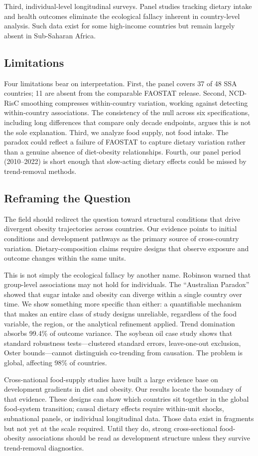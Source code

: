 Third, individual-level longitudinal surveys. Panel studies tracking dietary intake and health outcomes eliminate the ecological fallacy inherent in country-level analysis. Such data exist for some high-income countries but remain largely absent in Sub-Saharan Africa.

\subsection{Limitations}

Four limitations bear on interpretation. First, the panel covers 37 of 48 SSA countries; 11 are absent from the comparable FAOSTAT release. Second, NCD-RisC smoothing compresses within-country variation, working against detecting within-country associations. The consistency of the null across six specifications, including long differences that compare only decade endpoints, argues this is not the sole explanation. Third, we analyze food supply, not food intake. The paradox could reflect a failure of FAOSTAT to capture dietary variation rather than a genuine absence of diet-obesity relationships. Fourth, our panel period (2010--2022) is short enough that slow-acting dietary effects could be missed by trend-removal methods.

\subsection{Reframing the Question}

The field should redirect the question toward structural conditions that drive divergent obesity trajectories across countries. Our evidence points to initial conditions and development pathways as the primary source of cross-country variation. Dietary-composition claims require designs that observe exposure and outcome changes within the same units.

This is not simply the ecological fallacy by another name. Robinson \cite{robinson1950} warned that group-level associations may not hold for individuals. The ``Australian Paradox'' \cite{barclay2011} showed that sugar intake and obesity can diverge within a single country over time. We show something more specific than either: a quantifiable mechanism that makes an entire class of study designs unreliable, regardless of the food variable, the region, or the analytical refinement applied. Trend domination absorbs 99.4\% of outcome variance. The soybean oil case study shows that standard robustness tests---clustered standard errors, leave-one-out exclusion, Oster bounds---cannot distinguish co-trending from causation. The problem is global, affecting 98\% of countries.

Cross-national food-supply studies have built a large evidence base on development gradients in diet and obesity. Our results locate the boundary of that evidence. These designs can show which countries sit together in the global food-system transition; causal dietary effects require within-unit shocks, subnational panels, or individual longitudinal data. Those data exist in fragments but not yet at the scale required. Until they do, strong cross-sectional food-obesity associations should be read as development structure unless they survive trend-removal diagnostics.
